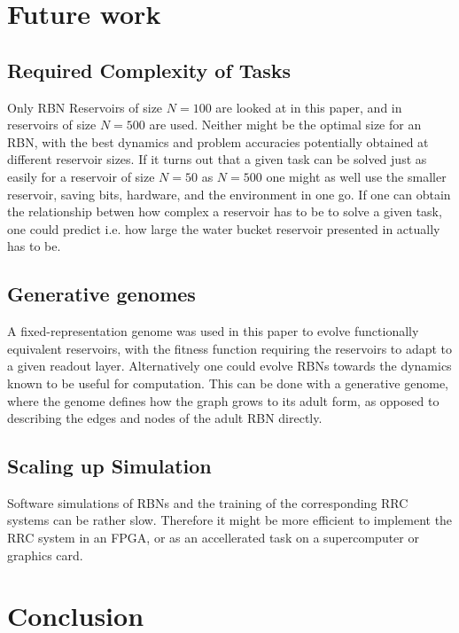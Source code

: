 \section{Future work}

\subsection{Required Complexity of Tasks}

Only RBN Reservoirs of size $N=100$ are looked at in this paper,
and in \cite{rbn-reservoir} reservoirs of size $N=500$ are used.
Neither might be the optimal size for an RBN,
with the best dynamics and problem accuracies potentially obtained at different reservoir sizes.
If it turns out that a given task can be solved just as easily for a reservoir of size $N=50$ as $N=500$ one might as well use the smaller reservoir,
saving bits, hardware, and the environment in one go.
If one can obtain the relationship betwen how complex a reservoir has to be to solve a given task,
one could predict i.e. how large the water bucket reservoir presented in \cite{fernando2003pattern} actually has to be.

\subsection{Generative genomes}

A fixed-representation genome was used in this paper to evolve functionally equivalent reservoirs,
with the fitness function requiring the reservoirs to adapt to a given readout layer.
Alternatively one could evolve RBNs towards the dynamics known to be useful for computation.
This can be done with a generative genome, where the genome defines how the graph grows to its adult form,
as opposed to describing the edges and nodes of the adult RBN directly.

\subsection{Scaling up Simulation}

Software simulations of RBNs and the training of the corresponding RRC systems can be rather slow.
Therefore it might be more efficient to implement the RRC system in an FPGA,
or as an accellerated task on a supercomputer or graphics card.

\section{Conclusion}

